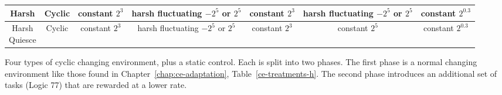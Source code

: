 \documentclass[PhD]{msu-thesis}
\begin{document}
\begin{table}[]
\begin{tabular}{|c|c||c|c||c|c|c|}
	Harsh & Cyclic & \makecell{constant \\ $2^3$} & \makecell{harsh \\ fluctuating \\ $-2^5$ or $2^5$} & \makecell{constant \\ $2^3$} & \makecell{harsh \\ fluctuating \\ $-2^5$ or $2^5$} & \makecell{constant \\ $2^{0.3}$} \\\hline
	\makecell{Harsh \\ Quiesce} & Cyclic & \makecell{constant \\ $2^3$} & \makecell{harsh \\ fluctuating \\ $-2^5$ or $2^5$} & \makecell{constant \\ $2^3$} & \makecell{constant \\ $2^5$} & \makecell{constant \\ $2^{0.3}$} \\\hline
	\end{tabular} 

	\begin{flushleft} Four types of cyclic changing environment, plus a static control. Each is split into two phases. The first phase is a normal changing environment like those found in Chapter~\ref{chap:ce-adaptation}, Table~\ref{ce-treatments-h}. The second phase introduces an additional set of tasks (Logic 77) that are rewarded at a lower rate.
	\end{flushleft}
	\label{cel-treatments-simple}
	\end{table}
\end{document}
